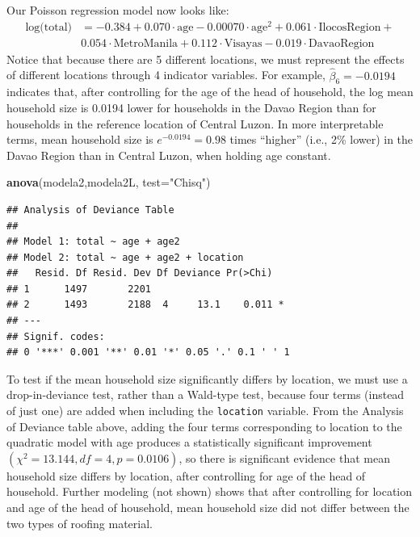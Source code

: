 \documentclass[
]{krantz}
\newenvironment{Shaded}{\begin{snugshade}}{\end{snugshade}}
\newcommand{\DataTypeTok}[1]{\textcolor[rgb]{0.27,0.27,0.27}{#1}}
\newcommand{\KeywordTok}[1]{\textcolor[rgb]{0.27,0.27,0.27}{\textbf{#1}}}
\newcommand{\NormalTok}[1]{#1}
\newcommand{\StringTok}[1]{\textcolor[rgb]{0.5,0.5,0.5}{#1}}
\begin{document}
Our Poisson regression model now looks like:
\begin{align}
\textrm{log(total)} & = -0.384 + 0.070 \cdot \textrm{age} - 0.00070 \cdot \textrm{age}^2 +0.061 \cdot \textrm{IlocosRegion} + \\ 
 & 0.054 \cdot\textrm{MetroManila}  +0.112 \cdot\textrm{Visayas} - 0.019 \cdot \textrm{DavaoRegion}
\end{align}
Notice that because there are 5 different locations, we must represent the effects of different locations through 4 indicator variables. For example, \(\hat{\beta}_6=-0.0194\) indicates that, after controlling for the age of the head of household, the log mean household size is 0.0194 lower for households in the Davao Region than for households in the reference location of Central Luzon. In more interpretable terms, mean household size is \(e^{-0.0194}=0.98\) times ``higher'' (i.e., 2\% lower) in the Davao Region than in Central Luzon, when holding age constant.

\begin{Shaded}
\begin{Highlighting}[]
\KeywordTok{anova}\NormalTok{(modela2,modela2L, }\DataTypeTok{test=}\StringTok{"Chisq"}\NormalTok{)}
\end{Highlighting}
\end{Shaded}

\begin{verbatim}
## Analysis of Deviance Table
## 
## Model 1: total ~ age + age2
## Model 2: total ~ age + age2 + location
##   Resid. Df Resid. Dev Df Deviance Pr(>Chi)  
## 1      1497       2201                       
## 2      1493       2188  4     13.1    0.011 *
## ---
## Signif. codes:  
## 0 '***' 0.001 '**' 0.01 '*' 0.05 '.' 0.1 ' ' 1
\end{verbatim}

To test if the mean household size significantly differs by location, we must use a drop-in-deviance test, rather than a Wald-type test, because four terms (instead of just one) are added when including the \texttt{location} variable. From the Analysis of Deviance table above, adding the four terms corresponding to location to the quadratic model with age produces a statistically significant improvement \((\chi^2=13.144, df = 4, p=0.0106)\), so there is significant evidence that mean household size differs by location, after controlling for age of the head of household. Further modeling (not shown) shows that after controlling for location and age of the head of household, mean household size did not differ between the two types of roofing material.
\end{document}
